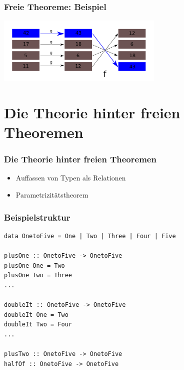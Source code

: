 \documentclass{beamer}
\begin{document}

\begin{frame}
\frametitle{Freie Theoreme: Beispiel}

\begin{center}
\includegraphics[width=300px]{mapgf}
\end{center}

\end{frame}


\section{Die Theorie hinter freien Theoremen}

\begin{frame}
\frametitle{Die Theorie hinter freien Theoremen}

\begin{itemize}
\item Auffassen von Typen als Relationen
\item Parametrizitätstheorem
\end{itemize}
\end{frame}


\begin{frame}[fragile]
\frametitle{Beispielstruktur}
\begin{verbatim}
data OnetoFive = One | Two | Three | Four | Five

plusOne :: OnetoFive -> OnetoFive
plusOne One = Two
plusOne Two = Three
...

doubleIt :: OnetoFive -> OnetoFive
doubleIt One = Two
doubleIt Two = Four
...

plusTwo :: OnetoFive -> OnetoFive
halfOf :: OnetoFive -> OnetoFive
\end{verbatim}
\end{frame}
\end{document}
